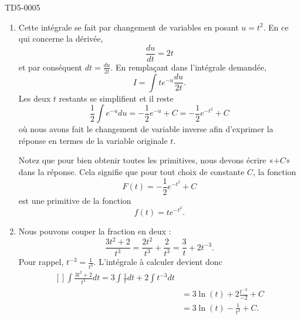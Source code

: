 
\begin{corrige}{TD5-0005}

	\begin{enumerate}
		\item
			Cette intégrale se fait par changement de variables en posant $u=t^2$. En ce qui concerne la dérivée,
			\begin{equation}
				\frac{ du }{ dt }=2t
			\end{equation}
			et par conséquent $dt=\frac{ du }{ 2t }$. En remplaçant dans l'intégrale demandée,
			\begin{equation}
				I=\int t e^{-u}\frac{ du }{ 2t }.
			\end{equation}
			Les deux $t$ restants se simplifient et il reste
			\begin{equation}
				\frac{ 1 }{2}\int e^{-u}du=-\frac{1 }{2} e^{-u}+C=-\frac{ 1 }{2} e^{-t^2}+C
			\end{equation}
			où nous avons fait le changement de variable inverse afin d'exprimer la réponse en termes de la variable originale $t$.

			Notez que pour bien obtenir toutes les primitives, nous devons écrire «$+C$» dans la réponse. Cela signifie que pour tout choix de constante $C$, la fonction
			\begin{equation}
				F(t)=-\frac{ 1 }{2} e^{-t^2}+C
			\end{equation}
			est une primitive de la fonction
			\begin{equation}
				f(t)=t e^{-t^2}.
			\end{equation}
		\item
			Nous pouvons couper la fraction en deux :
			\begin{equation}
				\frac{ 3t^2+2 }{ t^3 }=\frac{ 2t^2 }{ t^3 }+\frac{ 2 }{ t^3 }=\frac{ 3 }{ t }+2t^{-3}.
			\end{equation}
			Pour rappel, $t^{-3}=\frac{1}{ t^3 }$. L'intégrale à calculer devient donc
			\begin{equation}
				\begin{aligned}[]
					\int \frac{ 3t^2+2 }{ t^3 }dt=3\int\frac{1}{ t }dt+2\int t^{-3}dt\\
					&=3\ln(t)+2\frac{ t^{-2} }{ -2 }+C\\
					&=3\ln(t)-\frac{1}{ t^2 }+C.
				\end{aligned}
			\end{equation}
	\end{enumerate}

\end{corrige}
